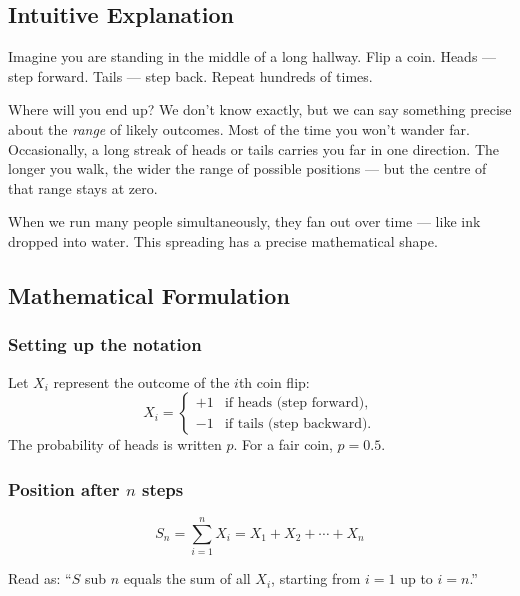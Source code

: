 \documentclass[12pt, a4paper]{article}
\begin{document}
\subsection{Intuitive Explanation}

\begin{intuition}
Imagine you are standing in the middle of a long hallway.  Flip a coin.
Heads --- step forward.  Tails --- step back.  Repeat hundreds of times.

Where will you end up?  We don't know exactly, but we can say something
precise about the \emph{range} of likely outcomes.  Most of the time you won't
wander far.  Occasionally, a long streak of heads or tails carries you far in
one direction.  The longer you walk, the wider the range of possible positions
--- but the centre of that range stays at zero.

When we run many people simultaneously, they fan out over time --- like ink
dropped into water.  This spreading has a precise mathematical shape.
\end{intuition}

\subsection{Mathematical Formulation}

\subsubsection*{Setting up the notation}

Let $X_i$ represent the outcome of the $i$th coin flip:
\[
  X_i =
  \begin{cases}
    +1 & \text{if heads (step forward),} \\
    -1 & \text{if tails (step backward).}
  \end{cases}
\]
The probability of heads is written $p$.  For a fair coin, $p = 0.5$.

\subsubsection*{Position after $n$ steps}

\[
  \boxed{S_n = \sum_{i=1}^{n} X_i = X_1 + X_2 + \cdots + X_n}
\]

\begin{plainlanguage}
Read as: ``$S$ sub $n$ equals the sum of all $X_i$, starting from $i=1$ up to
$i=n$.''
\end{plainlanguage}
\end{document}
